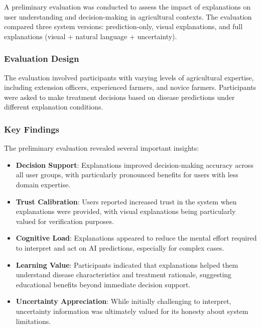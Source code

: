 A preliminary evaluation was conducted to assess the impact of explanations on user understanding and decision-making in agricultural contexts. The evaluation compared three system versions: prediction-only, visual explanations, and full explanations (visual + natural language + uncertainty).

\subsubsection{Evaluation Design}

The evaluation involved participants with varying levels of agricultural expertise, including extension officers, experienced farmers, and novice farmers. Participants were asked to make treatment decisions based on disease predictions under different explanation conditions.

\subsubsection{Key Findings}

The preliminary evaluation revealed several important insights:

\begin{itemize}
    \item \textbf{Decision Support}: Explanations improved decision-making accuracy across all user groups, with particularly pronounced benefits for users with less domain expertise.
    
    \item \textbf{Trust Calibration}: Users reported increased trust in the system when explanations were provided, with visual explanations being particularly valued for verification purposes.
    
    \item \textbf{Cognitive Load}: Explanations appeared to reduce the mental effort required to interpret and act on AI predictions, especially for complex cases.
    
    \item \textbf{Learning Value}: Participants indicated that explanations helped them understand disease characteristics and treatment rationale, suggesting educational benefits beyond immediate decision support.
    
    \item \textbf{Uncertainty Appreciation}: While initially challenging to interpret, uncertainty information was ultimately valued for its honesty about system limitations.
\end{itemize}

